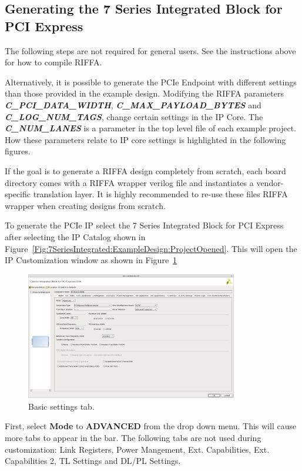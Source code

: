 \documentclass{refrep}
\newcommand{\figurewidth}{350px}
\newcommand{\ConfigSetting}[1]{\textbf{#1}}
\newcommand{\RIFFAParameter}[1]{\textit{\textbf{#1}}}
\begin{document}
\subsection{Generating the 7 Series Integrated Block for PCI Express}
\label{Sec:7SeriesIntegrated:Generating}
The following steps are not required for general users. See the instructions
above for how to compile RIFFA.

Alternatively, it is possible to generate the PCIe Endpoint with different
settings than those provided in the example design. Modifying the RIFFA
parameters \RIFFAParameter{C\_PCI\_DATA\_WIDTH},
\RIFFAParameter{C\_MAX\_PAYLOAD\_BYTES} and \RIFFAParameter{C\_LOG\_NUM\_TAGS},
change certain settings in the IP Core. The \RIFFAParameter{C\_NUM\_LANES} is a
parameter in the top level file of each example project. How these parameters
relate to IP core settings is highlighted in the following figures.

If the goal is to generate a RIFFA design completely from scratch, each board
directory comes with a RIFFA wrapper verilog file and instantiates a
vendor-specific translation layer. It is highly recommended to re-use these
files RIFFA wrapper when creating designs from scratch.

To generate the PCIe IP select the 7 Series Integrated Block for PCI Express
after selecting the IP Catalog shown in
Figure~\ref{Fig:7SeriesIntegrated:ExampleDesign:ProjectOpened}. This will open
the IP Customization window as shown in 
Figure~\ref{Fig:7SeriesIntegrated:Generating:7SeriesIntegratedTabBasic}
\begin{figure}[H]
  \includegraphics[width=\figurewidth,center]{7SeriesIntegratedTabBasic.png}
  \caption{Basic settings tab.}
  \label{Fig:7SeriesIntegrated:Generating:7SeriesIntegratedTabBasic}
\end{figure}
First, select \ConfigSetting{Mode} to \ConfigSetting{ADVANCED} from the drop
down menu. This will cause more tabs to appear in the bar. The following tabs
are not used during customization: Link Registers, Power Mangement,
Ext. Capabilities, Ext. Capabilities 2, TL Settings and DL/PL Settings.
\end{document}
